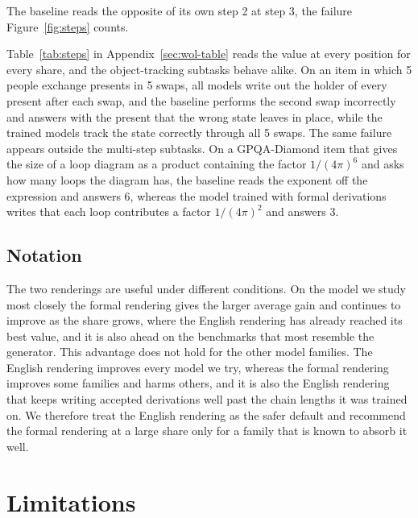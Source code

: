 \documentclass{article}
\begin{document}
The baseline reads the opposite of its own step 2 at step 3, the failure
Figure~\ref{fig:steps} counts.



Table~\ref{tab:steps} in Appendix~\ref{sec:wol-table} reads the value at every
position for every share, and the object-tracking subtasks behave alike. On an
item in which 5 people exchange presents in 5 swaps, all models write out the
holder of every present after each swap, and the baseline performs the second
swap incorrectly and answers with the present that the wrong state leaves in
place, while the trained models track the state correctly through all 5 swaps. The same
failure appears outside the multi-step subtasks. On a GPQA-Diamond item that
gives the size of a loop diagram as a product containing the factor
$1/(4\pi)^6$ and asks how many loops the diagram has, the baseline reads the
exponent off the expression and answers 6, whereas the model trained with
formal derivations writes that each loop contributes a factor $1/(4\pi)^2$ and
answers 3.

\subsection{Notation}

The two renderings are useful under different conditions. On the model we study
most closely the formal rendering gives the larger average gain and continues
to improve as the share grows, where the English rendering has already reached
its best value, and it is also ahead on the benchmarks that most resemble the
generator. This advantage does not hold for the other model families. The
English rendering improves every model we try, whereas the formal rendering
improves some families and harms others, and it is also the English rendering
that keeps writing accepted derivations well past the chain lengths it was
trained on. We therefore treat the English rendering as the safer default and
recommend the formal rendering at a large share only for a family that is known
to absorb it well.

\section{Limitations}
\label{sec:limits}
\end{document}
